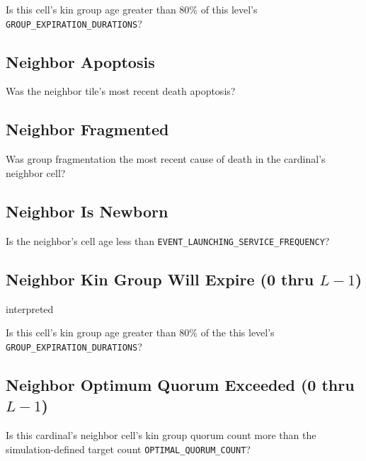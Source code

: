 
Is this cell's kin group age greater than 80\% of this level's \texttt{GROUP\_EXPIRATION\_DURATIONS}?

\subsection{Neighbor Apoptosis}

Was the neighbor tile's most recent death apoptosis?


\subsection{Neighbor Fragmented}

Was group fragmentation the most recent cause of death in the cardinal's neighbor cell?


\subsection{Neighbor Is Newborn}


Is the neighbor's cell age less than \texttt{EVENT\_LAUNCHING\_SERVICE\_FREQUENCY}?

\subsection{Neighbor Kin Group Will Expire (0 thru $L-1$)}{interpreted}


Is this cell's kin group age greater than 80\% of the this level's \texttt{GROUP\_EXPIRATION\_DURATIONS}?

\subsection{Neighbor Optimum Quorum Exceeded (0 thru $L-1$)}


Is this cardinal's neighbor cell's kin group quorum count more than the simulation-defined target count \texttt{OPTIMAL\_QUORUM\_COUNT}?

